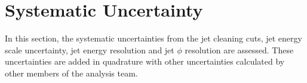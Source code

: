 \section{Systematic Uncertainty}
\label{GBJ2:system}

In this section, the systematic uncertainties from the jet cleaning cuts, jet energy scale uncertainty, jet energy resolution and jet $\phi$ resolution are assessed.
These uncertainties are added in quadrature with other uncertainties calculated by other members of the analysis team. 


